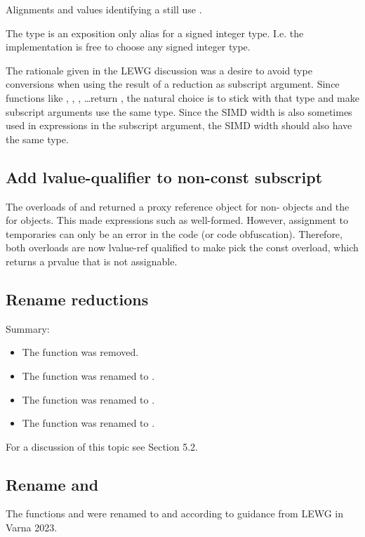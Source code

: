 Alignments and values identifying a  still use .

The type \simdsizetype{} is an exposition only alias for a signed integer type.
I.e. the implementation is free to choose any signed integer type.

The rationale given in the LEWG discussion was a desire to avoid type
conversions when using the result of a \mask reduction as subscript argument.
Since  functions like , ,
, \ldots return , the natural choice is to
stick with that type and make subscript arguments use the same type.
Since the SIMD width is also sometimes used in expressions in the subscript
argument, the SIMD width should also have the same type.

\subsection{Add lvalue-qualifier to non-const subscript}\label{sec:lvalue-subscript}
The  overloads of \simd and \mask returned a
proxy reference object for non- objects and the 
for  objects.
This made expressions such as  well-formed.
However, assignment to temporaries can only be an error in the code (or code obfuscation).
Therefore, both  overloads are now lvalue-ref qualified to
make  pick the const overload, which returns a prvalue that is
not assignable.

\subsection{Rename  reductions}
Summary:
\begin{itemize}
  \item The function \stdx{} was removed.
  \item The function \stdx{} was renamed to \std{}.
  \item The function \stdx{} was renamed to \std{}.
  \item The function \stdx{} was renamed to \std{}.
\end{itemize}

For a discussion of this topic see  Section 5.2.

\subsection{Rename  and }\label{sec:hminhmax}
The functions  and  were renamed to
 and  according to guidance from LEWG in
Varna 2023.

